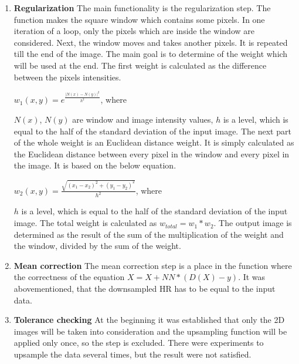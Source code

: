 \begin{enumerate}
\item \textbf{Regularization}
\newline The main functionality is the regularization step. The function makes the square window which contains some pixels. In one iteration of a loop, only the pixels which are inside the window are considered. Next, the window moves and takes another pixels. It is repeated till the end of the image. The main goal is to determine of the weight which will be used at the end.
\newline The first weight is calculated as the difference between the pixels intensities.
\newline 
\centerline {$w_{1}(x, y)= e^{\frac{|N(x)-N(y)|^{2}}{h^{2}}}$, where}
\newline
\newline $N(x)$, $N(y)$ are window and image intensity values,
\newline $h$ is a level, which is equal to the half of the standard deviation of the input image.
\newline The next part of the whole weight is an Euclidean distance weight. It is simply calculated as the Euclidean distance between every pixel in the window and every pixel in the image. It is based on the below equation.
\newline
\centerline{ $w_{2}(x,y)=\frac{\sqrt{(x_{1}-x_{2})^{2}+(y_{1}-y_{2})^{2}}}{h^{2}}$, where }
\newline
\newline $h$ is a level, which is equal to the half of the standard deviation of the input image.
\newline The total weight is calculated as $w_{total}=w_{1}*w_{2}$. The output image is determined as the result of the sum of the multiplication of the weight and the window, divided by the sum of the weight.

\item \textbf{Mean correction}
\newline The mean correction step is a place in the function where the correctness of the equation $X=X+NN*(D(X)-y)$. It was abovementioned, that the downsampled HR has to be equal to the input data.

\item \textbf{Tolerance checking}
At the beginning it was established that only the 2D images will be taken into consideration and the upsampling function will be applied only once, so the step is excluded. There were experiments to upsample the data several times, but the result were not satisfied.

\end{enumerate}
